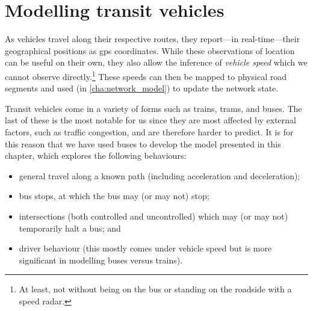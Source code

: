 
\chapter{Modelling transit vehicles}
\label{cha:vehicle_model}

\glsresetall{}

As vehicles travel along their respective routes, they report---in real-time---their geo\-graphical positions as \gls{gps} coordinates. While these observations of location can be useful on their own, they also allow the inference of \emph{vehicle speed} which we cannot observe directly.\footnote{At least, not without being on the bus or standing on the roadside with a speed radar.} These speeds can then be mapped to physical road segments and used (in \cref{cha:network_model}) to update the network state.

Transit vehicles come in a variety of forms such as trains, trams, and buses. The last of these is the most notable for us since they are most affected by external factors, such as traffic congestion, and are therefore harder to predict. It is for this reason that we have used buses to develop the model presented in this chapter, which explores the following behaviours:
\begin{itemize}
\item general travel along a known path (including acceleration and deceleration);
\item bus stops, at which the bus may (or may not) stop;
\item intersections (both controlled and uncontrolled) which may (or may not) temporarily halt a bus; and
\item driver behaviour (this mostly comes under vehicle speed but is more significant in modelling buses versus trains).
\end{itemize}


